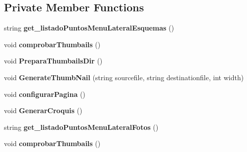 \subsection*{Private Member Functions}
\begin{DoxyCompactItemize}
\item 
string {\bfseries get\+\_\+listado\+Puntos\+Menu\+Lateral\+Esquemas} ()\hypertarget{class_s_i_c_a_h___galeria__galeria_a40a729dcfc611d424a4ff712fa6d663c}{}\label{class_s_i_c_a_h___galeria__galeria_a40a729dcfc611d424a4ff712fa6d663c}

\item 
void {\bfseries comprobar\+Thumbails} ()\hypertarget{class_s_i_c_a_h___galeria__galeria_a935d122fb188bc13e60d3a74ea87f47d}{}\label{class_s_i_c_a_h___galeria__galeria_a935d122fb188bc13e60d3a74ea87f47d}

\item 
void {\bfseries Prepara\+Thumbails\+Dir} ()\hypertarget{class_s_i_c_a_h___galeria__galeria_ac8aadd8d535b52d8e2117560cd5803b1}{}\label{class_s_i_c_a_h___galeria__galeria_ac8aadd8d535b52d8e2117560cd5803b1}

\item 
void {\bfseries Generate\+Thumb\+Nail} (string sourcefile, string destinationfile, int width)\hypertarget{class_s_i_c_a_h___galeria__galeria_a29c1269960bdd71448aab3bc51b4ee68}{}\label{class_s_i_c_a_h___galeria__galeria_a29c1269960bdd71448aab3bc51b4ee68}

\item 
void {\bfseries configurar\+Pagina} ()\hypertarget{class_s_i_c_a_h___galeria__galeria_a5dce90bf1628bf8a761875eab63869d3}{}\label{class_s_i_c_a_h___galeria__galeria_a5dce90bf1628bf8a761875eab63869d3}

\item 
void {\bfseries Generar\+Croquis} ()\hypertarget{class_s_i_c_a_h___galeria__galeria_a8d25c739551a131344b0382f610cd429}{}\label{class_s_i_c_a_h___galeria__galeria_a8d25c739551a131344b0382f610cd429}

\item 
string {\bfseries get\+\_\+listado\+Puntos\+Menu\+Lateral\+Fotos} ()\hypertarget{class_s_i_c_a_h___galeria__galeria_a9be3c074de302e7917bf6598df4a0da5}{}\label{class_s_i_c_a_h___galeria__galeria_a9be3c074de302e7917bf6598df4a0da5}

\item 
void {\bfseries comprobar\+Thumbails} ()\hypertarget{class_s_i_c_a_h___galeria__galeria_a935d122fb188bc13e60d3a74ea87f47d}{}\label{class_s_i_c_a_h___galeria__galeria_a935d122fb188bc13e60d3a74ea87f47d}


\end{DoxyCompactItemize}
